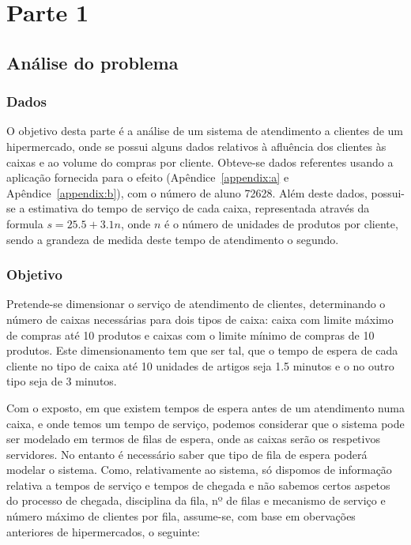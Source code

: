 \chapter{Parte 1}
\label{cap:p1}

\section{Análise do problema}

\subsection{Dados}
O objetivo desta parte é a análise de um sistema de atendimento a clientes de um
hipermercado, onde se possui alguns dados relativos à afluência dos clientes às
caixas e ao volume do compras por cliente. Obteve-se dados referentes usando
a aplicação fornecida para o efeito (Apêndice~\ref{appendix:a}
e Apêndice~\ref{appendix:b}), com o número de aluno 72628. Além deste
dados, possui-se a estimativa do tempo de serviço de cada caixa, representada
através da formula $s=25.5+3.1n$, onde $n$ é o número de unidades de produtos
por cliente, sendo a grandeza de medida deste tempo de atendimento o segundo. 

\subsection{Objetivo}

Pretende-se dimensionar o serviço de atendimento de clientes, determinando
o número de caixas necessárias para dois tipos de caixa: caixa com limite máximo
de compras até 10 produtos e caixas com o limite mínimo de compras de 10
produtos. Este dimensionamento tem que ser tal, que o tempo de espera de cada
cliente no tipo de caixa até 10 unidades de artigos seja 1.5 minutos e o no
outro tipo seja de 3 minutos.

Com o exposto, em que existem tempos de espera antes de um atendimento numa
caixa, e onde temos um tempo de serviço, podemos considerar que o sistema pode
ser modelado em termos de filas de espera, onde as caixas serão os respetivos
servidores. No entanto é necessário saber que tipo de fila de espera poderá
modelar o sistema. Como, relativamente ao sistema, só dispomos de informação
relativa a tempos de serviço e tempos de chegada e não sabemos certos aspetos do
processo de chegada, disciplina da fila, nº de filas e mecanismo de serviço
e número máximo de clientes por fila, assume-se, com base em obervações
anteriores de hipermercados, o seguinte:

